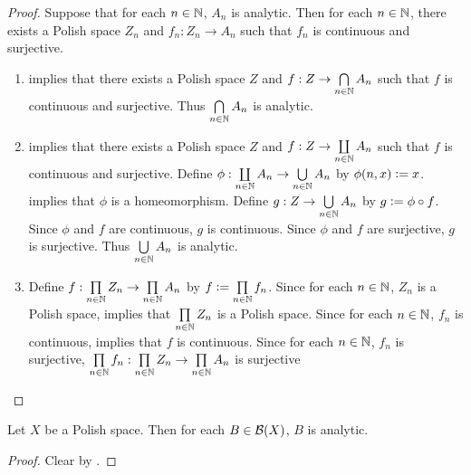 \documentclass{book}
\begin{document}
	\begin{proof}
		Suppose that for each $n \in \mathbb{N}$, $A_n$ is analytic. Then for each $n \in \mathbb{N}$, there exists a Polish space $Z_n$ and $f_n: Z_n \rightarrow A_n$ such that $f_n$ is continuous and surjective. 
		\begin{enumerate}
			\item {} implies that there exists a Polish space $Z$ and $f:Z \rightarrow \bigcap\limits_{n \in \mathbb{N}} A_n$ such that $f$ is continuous and surjective. Thus $\bigcap\limits_{n \in \mathbb{N}} A_n$ is analytic. 
			\item {} implies that there exists a Polish space $Z$ and $f:Z \rightarrow \coprod\limits_{n \in \mathbb{N}} A_n$ such that $f$ is continuous and surjective. Define $\phi: \coprod\limits_{n \in \mathbb{N}} A_n \rightarrow \bigcup\limits_{n \in \mathbb{N}} A_n$ by $\phi(n,  x) \vcentcolon= x$.  implies that $\phi$ is a homeomorphism. Define $g: Z \rightarrow \bigcup\limits_{n \in \mathbb{N}} A_n$ by $g \vcentcolon= \phi \circ f$. Since $\phi$ and $f$ are continuous, $g$ is continuous. Since $\phi$ and $f$ are surjective, $g$ is surjective. Thus $\bigcup\limits_{n \in \mathbb{N}} A_n$ is analytic.
			\item Define $f: \prod\limits_{n \in \mathbb{N}} Z_n \rightarrow \prod\limits_{n \in \mathbb{N}} A_n$ by $f \vcentcolon= \prod\limits_{n \in \mathbb{N}}f_n$. Since for each $n \in \mathbb{N}$, $Z_n$ is a Polish space,  implies that $\prod\limits_{n \in \mathbb{N}} Z_n$ is a Polish space. Since for each $n \in \mathbb{N}$, $f_n$ is continuous,  implies that $f$ is continuous. Since for each $n \in \mathbb{N}$, $f_n$ is surjective, $\prod\limits_{n \in \mathbb{N}}f_n : \prod\limits_{n \in \mathbb{N}} Z_n \rightarrow \prod\limits_{n \in \mathbb{N}} A_n$ is surjective  %
		\end{enumerate}
	\end{proof}

	\begin{ex} 
		Let $X$ be a Polish space. Then for each $B \in \mathcal{B}(X)$, $B$ is analytic.
	\end{ex}

	\begin{proof}
		Clear by .
	\end{proof}
\end{document}
